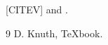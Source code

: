 \documentclass{article}
\begin{document}
{\def\cite{CITEV}[\cite]} and \cite{knuth}.
\begin{thebibliography}{9} D. Knuth, TeXbook.\end{thebibliography}
\end{document}
